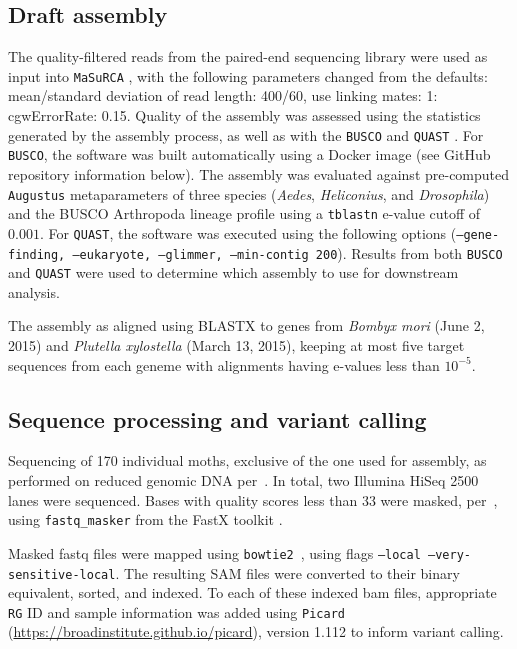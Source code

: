 \documentclass[smallextended]{svjour3}
\begin{document}
\subsection*{Draft assembly}

The quality-filtered reads from the paired-end sequencing library were used as input into
\texttt{MaSuRCA} \citep[][versions 2.3.2, 3.1.3]{Zimin:2013kn}, with the
following parameters changed from the defaults: mean/standard deviation of read
length: 400/60, use linking mates: 1: cgwErrorRate: 0.15.  Quality of the
assembly was assessed using the statistics generated by the assembly process, as
well as with the \texttt{BUSCO} \citep[][version 1.1b1]{Simao:2015kk} and
\texttt{QUAST} \citep[][version 3.2]{Gurevich:2013je}. For \texttt{BUSCO}, the
software was built automatically using a Docker image (see GitHub repository
information below). The assembly was evaluated against pre-computed
\texttt{Augustus} \citep{Stanke:2003eo} metaparameters of three species
(\textit{Aedes}, \textit{Heliconius}, and \textit{Drosophila}) and the BUSCO
Arthropoda lineage profile using a \texttt{tblastn} e-value cutoff of $0.001$.
For \texttt{QUAST}, the software was executed using the following options
(\texttt{--gene-finding, --eukaryote, --glimmer, --min-contig 200}).  Results
from both \texttt{BUSCO} and \texttt{QUAST} were used to determine which
assembly to use for downstream analysis.

The assembly as aligned using BLASTX \citep[][version 2.2.30+]{Camacho:2009fc}
to genes from \textit{Bombyx mori} (June 2, 2015) and  \textit{Plutella
xylostella} (March 13, 2015), keeping at most five target sequences from each
geneme with alignments having e-values less than $10^{-5}$.


\subsection*{Sequence processing and variant calling} Sequencing of 170
individual moths, exclusive of the one used for assembly,  as performed on
reduced genomic DNA per~\cite{PARCHMAN:2012ca}. In total, two Illumina HiSeq
2500 lanes were sequenced. Bases with quality scores less than 33 were masked,
per~\cite{Yun:2014dn},  using \texttt{fastq\_masker} from the FastX toolkit
\citep[][version 0.0.14]{citeulike:9103573}.

Masked fastq files were mapped using \texttt{bowtie2}~\citep[][version
2.2.4]{Langmead:2012jh}, using flags  \texttt{--local --very-sensitive-local}.
The resulting  SAM files were converted to their binary equivalent, sorted,
and indexed. To each of these indexed bam files, appropriate \texttt{RG} ID and
sample information was added using \texttt{Picard}
(\url{https://broadinstitute.github.io/picard}), version 1.112 to inform variant
calling.
\end{document}
